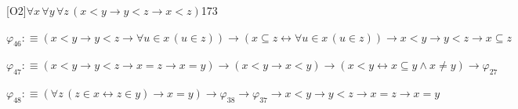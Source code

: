 \begin{fullproof}{[O2]}{$\forall x\,\forall y\,\forall z\,(x < y \to y < z \to x < z)$}{173}
\begin{abbrevlist}
\item $\varphi_{46} :\equiv (x < y \to y < z \to \forall u \in x\,(u \in z)) \to (x \subseteq z \leftrightarrow \forall u \in x\,(u \in z)) \to x < y \to y < z \to x \subseteq z$
\item $\varphi_{47} :\equiv (x < y \to y < z \to x = z \to x = y) \to (x < y \to x < y) \to (x < y \leftrightarrow x \subseteq y \land x \neq y) \to \varphi_{27}$
\item $\varphi_{48} :\equiv (\forall z\,(z \in x \leftrightarrow z \in y) \to x = y) \to \varphi_{38} \to \varphi_{37} \to x < y \to y < z \to x = z \to x = y$
\end{abbrevlist}
\end{fullproof}
